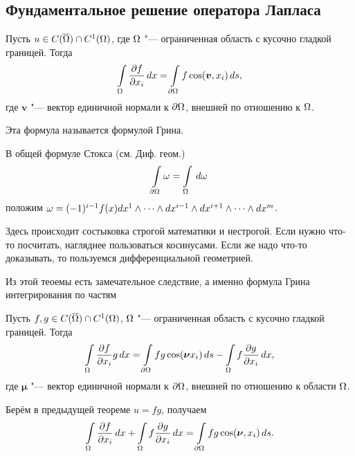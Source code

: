 \subsection{Фундаментальное решение оператора Лапласа}
\begin{The}
 Пусть $u\in C(\overline{\Omega})\cap C^1(\Omega)$, где $\Omega$ "--- ограниченная область с кусочно гладкой границей. Тогда
\[
  \int\limits_{\Omega}\frac{\partial f}{\partial x_i}\,dx = \int\limits_{\partial\Omega} f \cos(\boldsymbol v,x_i)\,ds,
\]
где $\boldsymbol v$ "--- вектор единичной нормали к $\partial\Omega$, внешней по отношению к $\Omega$.
\end{The}
Эта формула называется формулой Грина.
\begin{Proof}
  В общей формуле Стокса (см. Диф. геом.)
\[
  \int\limits_{\partial\Omega}\omega = \int\limits_{\Omega}\,d\omega
\]
положим $\omega = (-1)^{i-1}f(x)dx^1\wedge\dots\wedge dx^{i-1}\wedge dx^{i+1}\wedge\dots\wedge dx^m$.
\end{Proof}
Здесь происходит состыковка строгой математики и нестрогой. Если нужно что-то посчитать, нагляднее пользоваться косинусами. Если же надо что-то доказывать, то пользуемся дифференциальной геометрией.

Из этой теоемы есть замечательное следствие, а именно формула Грина интегрирования по частям
\begin{The}
  Пусть $f,g\in C(\overline{\Omega})\cap C^1(\Omega)$, $\Omega$ "--- ограниченная область с кусочно гладкой границей. Тогда
\[
  \int\limits_{\Omega}\frac{\partial f}{\partial x_i}g\,dx = \int\limits_{\partial\Omega} fg\cos(\boldsymbol \nu x_i)\,ds - \int\limits_{\Omega} f\frac{\partial g}{\partial x_i}\,dx,
\]
где $\boldsymbol \mu$ "--- вектор единичной нормали к $\partial\Omega$, внешней по отношению к области $\Omega$.
\end{The}
\begin{Proof}
  Берём в предыдущей теореме $u = fg$, получаем
\[
  \int\limits_{\Omega}\frac{\partial f}{\partial x_i}\,dx +\int\limits_{\Omega} f\frac{\partial g}{\partial x_i}\,dx = \int\limits_{\partial\Omega}fg\cos(\boldsymbol\nu,x_i)\,ds.
\]
\end{Proof}
